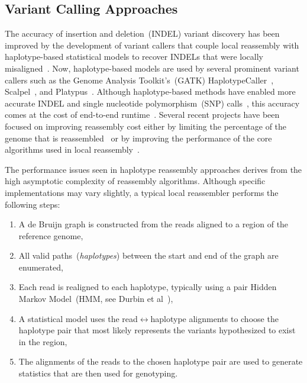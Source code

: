 \documentclass[phd]{ucbthesis}
\begin{document}
\subsection{Variant Calling Approaches}
\label{sec:variant-calling-approaches}

The accuracy of insertion and deletion~(INDEL) variant discovery has been improved by the development
of variant callers that couple local reassembly with haplotype-based statistical models to recover INDELs
that were locally misaligned~\cite{albers11}. Now, haplotype-based models are used by several prominent variant callers such as the Genome
Analysis Toolkit's~(GATK) {HaplotypeCaller}~\cite{depristo11}, {Scalpel}~\cite{narzisi14}, and
{Platypus}~\cite{rimmer14}. Although haplotype-based methods have enabled more accurate INDEL
and single nucleotide polymorphism~(SNP) calls~\cite{bao14}, this accuracy comes at the cost of
end-to-end runtime~\cite{talwalkar14}. Several recent projects have been focused on improving
reassembly cost either by limiting the percentage of the genome that is reassembled~\cite{bloniarz14} or
by improving the performance of the core algorithms used in local reassembly~\cite{rimmer14}.

The performance issues seen in haplotype reassembly approaches derives from the high asymptotic
complexity of reassembly algorithms. Although specific implementations may vary slightly, a typical
local reassembler performs the following steps:

\begin{enumerate}
\item A de Bruijn graph is constructed from the reads aligned to a region of the reference genome,
\item All valid paths~(\emph{haplotypes}) between the start and end of the graph are enumerated,
\item Each read is realigned to each haplotype, typically using a pair Hidden Markov Model~(HMM,
see Durbin et al~\cite{durbin98}),
\item A statistical model uses the read$\leftrightarrow$haplotype alignments to choose the haplotype pair
that most likely represents the variants hypothesized to exist in the region, 
\item The alignments of the reads to the chosen haplotype pair are used to generate statistics that are
then used for genotyping.
\end{enumerate}
\end{document}
